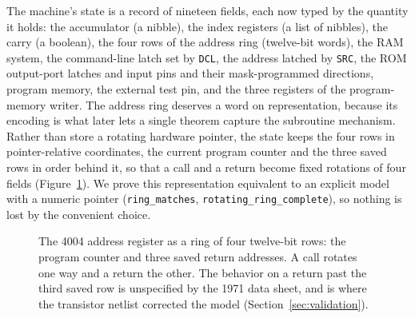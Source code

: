 \documentclass[11pt]{amsart}
\theoremstyle{plain}
\theoremstyle{definition}
\newcommand{\code}[1]{\texttt{#1}}
\begin{document}
The machine's state is a record of nineteen fields, each now typed by the quantity it holds: the accumulator (a nibble), the index registers (a list of nibbles), the carry (a boolean), the four rows of the address ring (twelve-bit words), the RAM system, the command-line latch set by \code{DCL}, the address latched by \code{SRC}, the ROM output-port latches and input pins and their mask-programmed directions, program memory, the external test pin, and the three registers of the program-memory writer. The address ring deserves a word on representation, because its encoding is what later lets a single theorem capture the subroutine mechanism. Rather than store a rotating hardware pointer, the state keeps the four rows in pointer-relative coordinates, the current program counter and the three saved rows in order behind it, so that a call and a return become fixed rotations of four fields (Figure~\ref{fig:ring}). We prove this representation equivalent to an explicit model with a numeric pointer (\code{ring\_matches}, \code{rotating\_ring\_complete}), so nothing is lost by the convenient choice.

\begin{figure}[ht]
\centering
{}
\caption{The 4004 address register as a ring of four twelve-bit rows: the program counter and three saved return addresses. A call rotates one way and a return the other. The behavior on a return past the third saved row is unspecified by the 1971 data sheet, and is where the transistor netlist corrected the model (Section~\ref{sec:validation}).}\label{fig:ring}
\end{figure}
\end{document}
